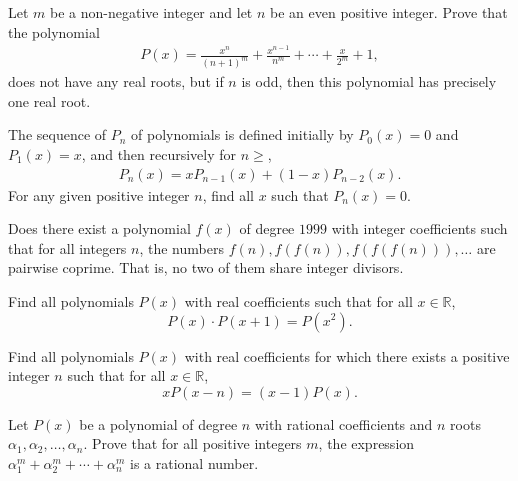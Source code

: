 \begin{question}
    Let $m$ be a non-negative integer and let $n$ be an even positive integer. Prove that the polynomial
    \begin{align*}
        P(x) = \frac{x^n}{(n+1)^m} + \frac{x^{n-1}}{n^m} + \cdots + \frac{x}{2^m} + 1,
    \end{align*}
    does not have any real roots, but if $n$ is odd, then this polynomial has precisely one real root.
\end{question}

\begin{question}[name={1996 Austrian--Polish}]
    The sequence of $P_n$ of polynomials is defined initially by $P_0(x)=0$ and $P_1(x)=x$, and then recursively for $n\geq$, 
    \begin{align*}
        P_n(x) = x P_{n-1}(x) + (1-x)P_{n-2}(x).
    \end{align*}
    For any given positive integer $n$, find all $x$ such that $P_n(x)=0$.
\end{question}

\begin{question}[name={2000 Iran}]
    Does there exist a polynomial $f(x)$ of degree $1999$ with integer coefficients such that for all integers $n$, the numbers $f(n), f(f(n)), f(f(f(n))), \dots$ are pairwise coprime. That is, no two of them share integer divisors.
\end{question}

\begin{question}
    Find all polynomials $P(x)$ with real coefficients such that for all $x\in \mathbb R$,
    \[P(x)\cdot P(x+1) = P(x^2).\]
\end{question}



\begin{question}[name={1999 Iran}]
    Find all polynomials $P(x)$ with real coefficients for which there exists a positive integer $n$ such that for all $x\in\mathbb R$,
    \[xP(x-n)=(x-1)P(x).\]
\end{question}

\begin{question}
    Let $P(x)$ be a polynomial of degree $n$ with rational coefficients and $n$ roots $\alpha_1,\alpha_2,\dots,\alpha_n$. Prove that for all positive integers $m$, the expression $\alpha_1^m+\alpha_2^m+\cdots+\alpha_n^m$ is a rational number.
\end{question}



